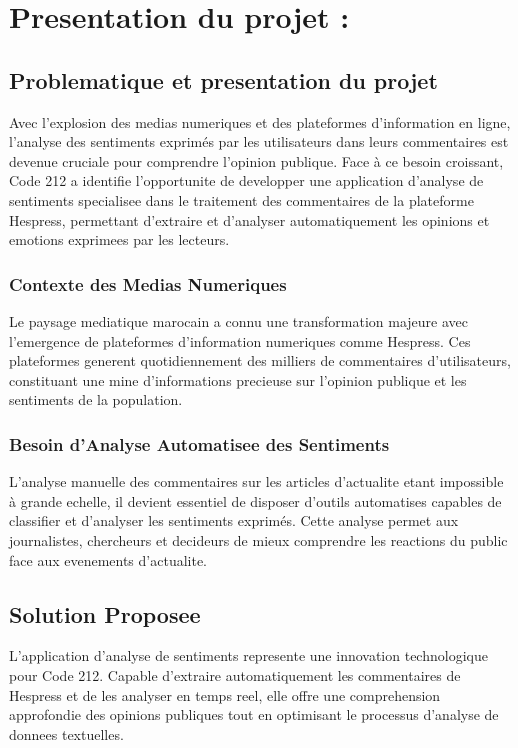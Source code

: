 \chapter{Presentation du projet :}

\section{Problematique et presentation du projet}
Avec l'explosion des medias numeriques et des plateformes d'information en ligne, l'analyse des sentiments exprimés par les utilisateurs dans leurs commentaires est devenue cruciale pour comprendre l'opinion publique. Face à ce besoin croissant, Code 212 a identifie l'opportunite de developper une application d'analyse de sentiments specialisee dans le traitement des commentaires de la plateforme Hespress, permettant d'extraire et d'analyser automatiquement les opinions et emotions exprimees par les lecteurs.

\subsection{Contexte des Medias Numeriques}
Le paysage mediatique marocain a connu une transformation majeure avec l'emergence de plateformes d'information numeriques comme Hespress. Ces plateformes generent quotidiennement des milliers de commentaires d'utilisateurs, constituant une mine d'informations precieuse sur l'opinion publique et les sentiments de la population.

\subsection{Besoin d'Analyse Automatisee des Sentiments}
L'analyse manuelle des commentaires sur les articles d'actualite etant impossible à grande echelle, il devient essentiel de disposer d'outils automatises capables de classifier et d'analyser les sentiments exprimés. Cette analyse permet aux journalistes, chercheurs et decideurs de mieux comprendre les reactions du public face aux evenements d'actualite.

\section{Solution Proposee}
L'application d'analyse de sentiments represente une innovation technologique pour Code 212. Capable d'extraire automatiquement les commentaires de Hespress et de les analyser en temps reel, elle offre une comprehension approfondie des opinions publiques tout en optimisant le processus d'analyse de donnees textuelles.

